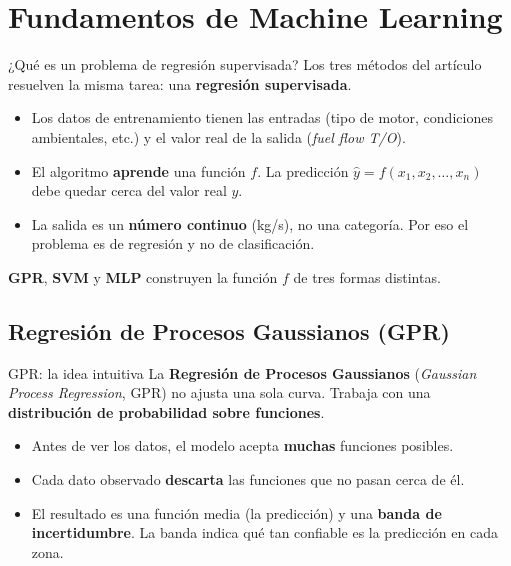 \documentclass{beamer}
\begin{document}
\section{Fundamentos de Machine Learning}

\begin{frame}{¿Qué es un problema de regresión supervisada?}
    \justifying
    Los tres métodos del artículo resuelven la misma tarea: una \textbf{regresión supervisada}.

    \begin{itemize}
        \item Los datos de entrenamiento tienen las entradas (tipo de motor, condiciones ambientales, etc.) y el valor real de la salida (\textit{fuel flow T/O}).
        \item El algoritmo \textbf{aprende} una función $f$. La predicción $\hat{y} = f(x_1, x_2, \dots, x_n)$ debe quedar cerca del valor real $y$.
        \item La salida es un \textbf{número continuo} (kg/s), no una categoría. Por eso el problema es de regresión y no de clasificación.
    \end{itemize}
    \bigskip

    \textbf{GPR}, \textbf{SVM} y \textbf{MLP} construyen la función $f$ de tres formas distintas.
\end{frame}

\subsection{Regresión de Procesos Gaussianos (GPR)}

\begin{frame}{GPR: la idea intuitiva}
    \justifying
    La \textbf{Regresión de Procesos Gaussianos} (\textit{Gaussian Process Regression}, GPR) no ajusta una sola curva. Trabaja con una \textbf{distribución de probabilidad sobre funciones}.

    \begin{itemize}
        \item Antes de ver los datos, el modelo acepta \textbf{muchas} funciones posibles.
        \item Cada dato observado \textbf{descarta} las funciones que no pasan cerca de él.
        \item El resultado es una función media (la predicción) y una \textbf{banda de incertidumbre}. La banda indica qué tan confiable es la predicción en cada zona.
    \end{itemize}
\end{frame}
\end{document}
